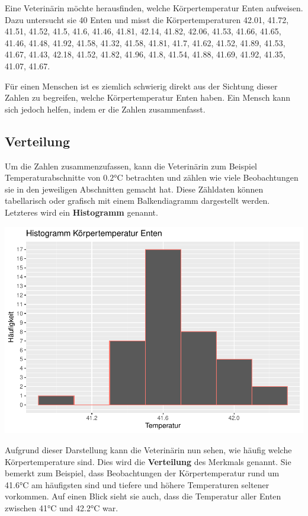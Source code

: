 \documentclass[
]{book}
\theoremstyle{definition}
\theoremstyle{definition}
\theoremstyle{definition}
\theoremstyle{definition}
\theoremstyle{remark}
\begin{document}
Eine Veterinärin möchte herausfinden, welche Körpertemperatur Enten aufweisen. Dazu untersucht sie 40 Enten und misst die Körpertemperaturen 42.01, 41.72, 41.51, 41.52, 41.5, 41.6, 41.46, 41.81, 42.14, 41.82, 42.06, 41.53, 41.66, 41.65, 41.46, 41.48, 41.92, 41.58, 41.32, 41.58, 41.81, 41.7, 41.62, 41.52, 41.89, 41.53, 41.67, 41.43, 42.18, 41.52, 41.82, 41.96, 41.8, 41.54, 41.88, 41.69, 41.92, 41.35, 41.07, 41.67.

Für einen Menschen ist es ziemlich schwierig direkt aus der Sichtung dieser Zahlen zu begreifen, welche Körpertemperatur Enten haben. Ein Mensch kann sich jedoch helfen, indem er die Zahlen zusammenfasst.

\subsection{Verteilung}\label{verteilung}

Um die Zahlen zusammenzufassen, kann die Veterinärin zum Beispiel Temperaturabschnitte von \(0.2\)°C betrachten und zählen wie viele Beobachtungen sie in den jeweiligen Abschnitten gemacht hat. Diese Zähldaten können tabellarisch oder grafisch mit einem Balkendiagramm dargestellt werden. Letzteres wird ein \textbf{Histogramm} genannt.

\includegraphics{aps_statistik1_files/figure-latex/enten_histogramm-1.pdf}

Aufgrund dieser Darstellung kann die Veterinärin nun sehen, wie häufig welche Körpertemperature sind. Dies wird die \textbf{Verteilung} des Merkmals genannt. Sie bemerkt zum Beispiel, dass Beobachtungen der Körpertemperatur rund um 41.6°C am häufigsten sind und tiefere und höhere Temperaturen seltener vorkommen. Auf einen Blick sieht sie auch, dass die Temperatur aller Enten zwischen 41°C und 42.2°C war.
\end{document}
